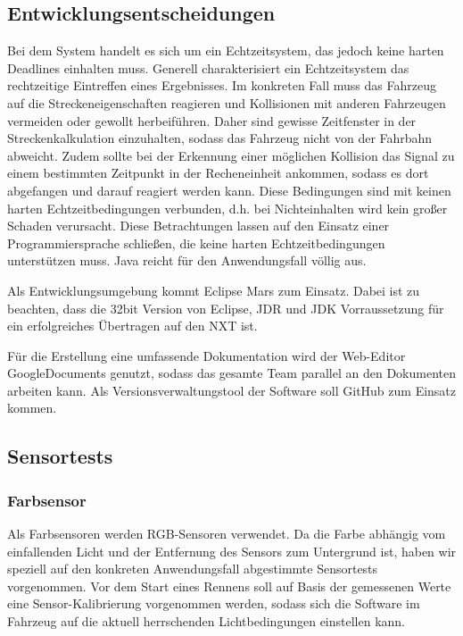 \documentclass[a4paper,12pt]{article}                                         %
\numberwithin{table}{section}                               %
\numberwithin{figure}{section}                              %
\begin{document}
	\subsection{Entwicklungsentscheidungen}
	Bei dem System handelt es sich um ein Echtzeitsystem, das jedoch keine harten Deadlines einhalten muss. Generell charakterisiert ein Echtzeitsystem das rechtzeitige Eintreffen eines Ergebnisses. Im konkreten Fall muss das Fahrzeug auf die Streckeneigenschaften reagieren und  Kollisionen mit anderen Fahrzeugen vermeiden oder gewollt herbeiführen. Daher sind gewisse Zeitfenster in der Streckenkalkulation einzuhalten, sodass das Fahrzeug nicht von der Fahrbahn abweicht. Zudem sollte  bei der Erkennung einer möglichen Kollision das Signal zu einem bestimmten Zeitpunkt in der Recheneinheit ankommen, sodass es dort abgefangen und darauf reagiert werden kann. Diese Bedingungen sind mit keinen harten Echtzeitbedingungen verbunden, d.h. bei Nichteinhalten wird kein großer Schaden verursacht.
	Diese Betrachtungen lassen auf den Einsatz einer Programmiersprache schließen, die keine harten Echtzeitbedingungen unterstützen muss. Java reicht für den Anwendungsfall völlig aus.
	
	\bigskip
	Als Entwicklungsumgebung kommt Eclipse Mars zum Einsatz. Dabei ist zu beachten, dass die 32bit Version von Eclipse, JDR und JDK Vorraussetzung für ein erfolgreiches Übertragen auf den NXT ist. 
	
	\bigskip
	Für die Erstellung eine umfassende Dokumentation wird der Web-Editor GoogleDocuments genutzt, sodass das gesamte Team parallel an den Dokumenten arbeiten kann. Als Versionsverwaltungstool der Software soll GitHub zum Einsatz kommen.
	
	\newpage
	\subsection{Sensortests}
	\subsubsection{Farbsensor}
	Als Farbsensoren werden RGB-Sensoren verwendet. Da die Farbe abhängig vom einfallenden Licht und der Entfernung des Sensors zum Untergrund ist, haben wir speziell auf den konkreten Anwendungsfall abgestimmte Sensortests vorgenommen. Vor dem Start eines Rennens soll auf Basis der gemessenen Werte eine Sensor-Kalibrierung vorgenommen werden, sodass sich die Software im Fahrzeug auf die aktuell herrschenden Lichtbedingungen einstellen kann.  
	
\end{document}
